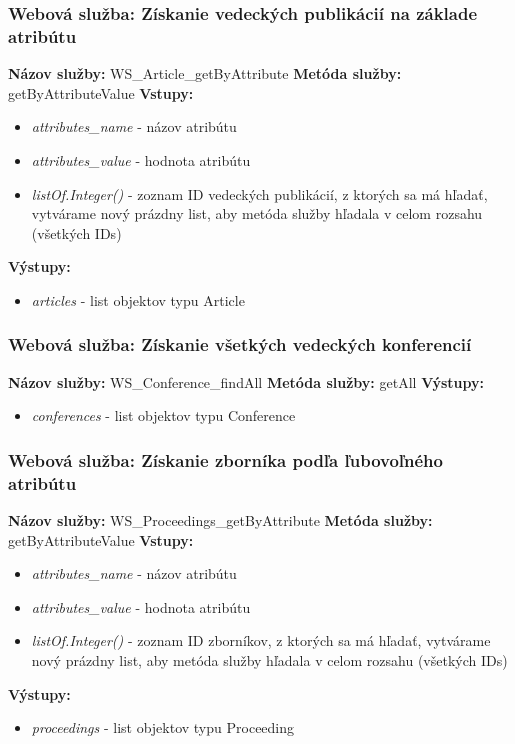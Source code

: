 \documentclass[10pt,oneside,slovak,a4paper]{article}
\begin{document}
\subsubsection{Webová služba: Získanie vedeckých publikácií na základe atribútu}
\textbf{Názov služby:} WS\_Article\_getByAttribute
\textbf{Metóda služby:} getByAttributeValue
\textbf{Vstupy:}
	\begin{itemize}
		\item \textit{attributes\_name} - názov atribútu
		\item \textit{attributes\_value} - hodnota atribútu
		\item \textit{listOf.Integer()} - zoznam ID vedeckých publikácií, z ktorých sa má hľadať, vytvárame nový prázdny list, aby metóda služby hľadala v celom rozsahu (všetkých IDs)
	\end{itemize}
\textbf{Výstupy:}
	\begin{itemize}
		\item \textit{articles} - list objektov typu Article
	\end{itemize}

\subsubsection{Webová služba: Získanie všetkých vedeckých konferencií}
\textbf{Názov služby:} WS\_Conference\_findAll
\textbf{Metóda služby:} getAll
\textbf{Výstupy:}
	\begin{itemize}
		\item \textit{conferences} - list objektov typu Conference
	\end{itemize}
	
\subsubsection{Webová služba: Získanie zborníka podľa ľubovoľného atribútu}
\textbf{Názov služby:} WS\_Proceedings\_getByAttribute
\textbf{Metóda služby:} getByAttributeValue
\textbf{Vstupy:}
	\begin{itemize}
		\item \textit{attributes\_name} - názov atribútu
		\item \textit{attributes\_value} - hodnota atribútu
		\item \textit{listOf.Integer()} - zoznam ID zborníkov, z ktorých sa má hľadať, vytvárame nový prázdny list, aby metóda služby hľadala v celom rozsahu (všetkých IDs)
	\end{itemize}
\textbf{Výstupy:}
	\begin{itemize}
		\item \textit{proceedings} - list objektov typu Proceeding
	\end{itemize}
	
\end{document}
